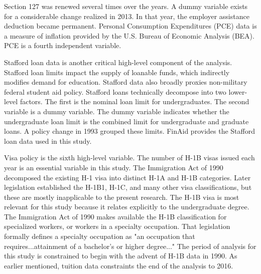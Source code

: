 \documentclass[review]{elsarticle}
\begin{document}
Section 127 was renewed several times over the years.
A dummy variable exists for a considerable change realized in 2013.
In that year, the employer assistance deduction became permanent.
Personal Consumption Expenditures (PCE) data is a measure of inflation provided by the U.S. Bureau of Economic Analysis (BEA)\cite{bea_2020}.
PCE is a fourth independent variable.

Stafford loan data is another critical high-level component of the analysis.
Stafford loan limits impact the supply of loanable funds, which indirectly modifies demand for education.
Stafford data also broadly proxies non-military federal student aid policy.
Stafford loans technically decompose into two lower-level factors.
The first is the nominal loan limit for undergraduates.
The second variable is a dummy variable.
The dummy variable indicates whether the undergraduate loan limit is the combined limit for undergraduate and graduate loans.
A policy change in 1993 grouped these limits.
FinAid provides the Stafford loan data used in this study\cite{finaid_2020}.

Visa policy is the sixth high-level variable.
The number of H-1B visas issued each year is an essential variable in this study.
The Immigration Act of 1990 decomposed the existing H-1 visa into distinct H-1A and H-1B categories.
Later legislation established the H-1B1, H-1C, and many other visa classifications, but these are mostly inapplicable to the present research.
The H-1B visa is most relevant for this study because it relates explicitly to the undergraduate degree.
The Immigration Act of 1990 makes available the H-1B classification for specialized workers, or workers in a specialty occupation.
That legislation formally defines a specialty occupation as "an occupation that requires...attainment of a bachelor's or higher degree..."
The period of analysis for this study is constrained to begin with the advent of H-1B data in 1990.
As earlier mentioned, tuition data constraints the end of the analysis to 2016.
\end{document}
